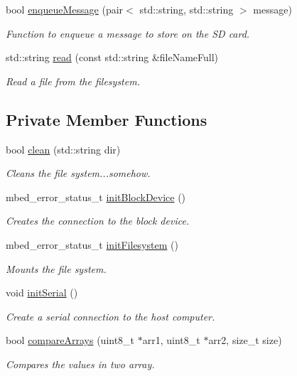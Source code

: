 \begin{DoxyCompactItemize}
bool \mbox{\hyperlink{class_sat_file_handler_a9f5a3c0ee440bf5a45f49add4dd2f04d}{enqueue\+Message}} (pair$<$ std\+::string, std\+::string $>$ message)
\begin{DoxyCompactList}\small\item\em Function to enqueue a message to store on the SD card. \end{DoxyCompactList}\item 
std\+::string \mbox{\hyperlink{class_sat_file_handler_a5529b9e3f7ec6ae60db4c9c83fbe6ea8}{read}} (const std\+::string \&file\+Name\+Full)
\begin{DoxyCompactList}\small\item\em Read a file from the filesystem. \end{DoxyCompactList}\end{DoxyCompactItemize}
\subsection*{Private Member Functions}
\begin{DoxyCompactItemize}
\item 
bool \mbox{\hyperlink{class_sat_file_handler_a61cd259dd830e9ee5044f22e127982a4}{clean}} (std\+::string dir)
\begin{DoxyCompactList}\small\item\em Cleans the file system...somehow. \end{DoxyCompactList}\item 
mbed\+\_\+error\+\_\+status\+\_\+t \mbox{\hyperlink{class_sat_file_handler_a6c31918d174a3161389665ef6c32c064}{init\+Block\+Device}} ()
\begin{DoxyCompactList}\small\item\em Creates the connection to the block device. \end{DoxyCompactList}\item 
mbed\+\_\+error\+\_\+status\+\_\+t \mbox{\hyperlink{class_sat_file_handler_a627ea649602f208a18a7248b3c1c966a}{init\+Filesystem}} ()
\begin{DoxyCompactList}\small\item\em Mounts the file system. \end{DoxyCompactList}\item 
\mbox{\label{class_sat_file_handler_a1e2e5da44ae0b6287b93ceee43878f18}} 
void \mbox{\hyperlink{class_sat_file_handler_a1e2e5da44ae0b6287b93ceee43878f18}{init\+Serial}} ()
\begin{DoxyCompactList}\small\item\em Create a serial connection to the host computer. \end{DoxyCompactList}\item 
bool \mbox{\hyperlink{class_sat_file_handler_ac65b0803b09b8ad0ab172e0db3fddd21}{compare\+Arrays}} (uint8\+\_\+t $\ast$arr1, uint8\+\_\+t $\ast$arr2, size\+\_\+t size)
\begin{DoxyCompactList}\small\item\em Compares the values in two array. \end{DoxyCompactList}\end{DoxyCompactItemize}
